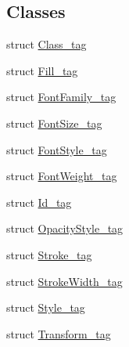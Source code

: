 \subsection*{Classes}
\begin{DoxyCompactItemize}
\item 
struct \hyperlink{structsambag_1_1disco_1_1svg_1_1_svg_object_1_1_class__tag}{Class\_\-tag}
\item 
struct \hyperlink{structsambag_1_1disco_1_1svg_1_1_svg_object_1_1_fill__tag}{Fill\_\-tag}
\item 
struct \hyperlink{structsambag_1_1disco_1_1svg_1_1_svg_object_1_1_font_family__tag}{FontFamily\_\-tag}
\item 
struct \hyperlink{structsambag_1_1disco_1_1svg_1_1_svg_object_1_1_font_size__tag}{FontSize\_\-tag}
\item 
struct \hyperlink{structsambag_1_1disco_1_1svg_1_1_svg_object_1_1_font_style__tag}{FontStyle\_\-tag}
\item 
struct \hyperlink{structsambag_1_1disco_1_1svg_1_1_svg_object_1_1_font_weight__tag}{FontWeight\_\-tag}
\item 
struct \hyperlink{structsambag_1_1disco_1_1svg_1_1_svg_object_1_1_id__tag}{Id\_\-tag}
\item 
struct \hyperlink{structsambag_1_1disco_1_1svg_1_1_svg_object_1_1_opacity_style__tag}{OpacityStyle\_\-tag}
\item 
struct \hyperlink{structsambag_1_1disco_1_1svg_1_1_svg_object_1_1_stroke__tag}{Stroke\_\-tag}
\item 
struct \hyperlink{structsambag_1_1disco_1_1svg_1_1_svg_object_1_1_stroke_width__tag}{StrokeWidth\_\-tag}
\item 
struct \hyperlink{structsambag_1_1disco_1_1svg_1_1_svg_object_1_1_style__tag}{Style\_\-tag}
\item 
struct \hyperlink{structsambag_1_1disco_1_1svg_1_1_svg_object_1_1_transform__tag}{Transform\_\-tag}
\end{DoxyCompactItemize}
